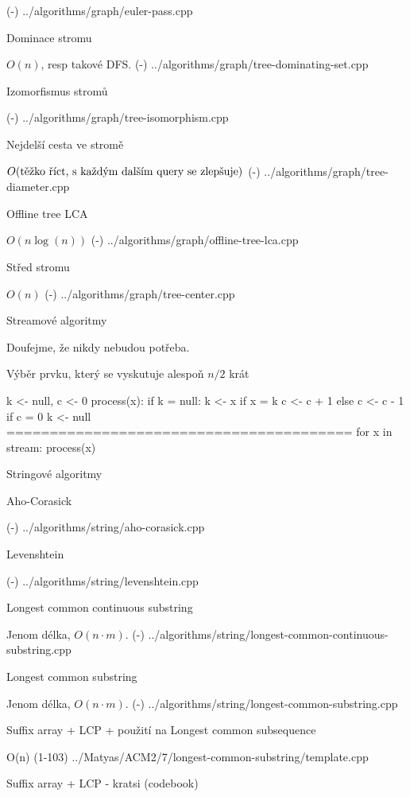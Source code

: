 \verbinput (-) ../algorithms/graph/euler-pass.cpp

\secc Dominace stromu 

$O(n)$, resp takové DFS.
\verbinput (-) ../algorithms/graph/tree-dominating-set.cpp

\secc Izomorfismus stromů

\verbinput (-) ../algorithms/graph/tree-isomorphism.cpp

\secc Nejdelší cesta ve stromě 

$O(\hbox{těžko říct, s každým dalším query se zlepšuje})$
\verbinput (-) ../algorithms/graph/tree-diameter.cpp

\secc Offline tree LCA 

$O(n\log(n))$
\verbinput (-) ../algorithms/graph/offline-tree-lca.cpp

\secc Střed stromu 

$O(n)$
\verbinput (-) ../algorithms/graph/tree-center.cpp

\sec Streamové algoritmy

Doufejme, že nikdy nebudou potřeba.

\secc Výběr prvku, který se vyskutuje alespoň $n/2$ krát

\begtt
k <- null, c <- 0
process(x):
  if k = null:
    k <- x
  if x = k
    c <- c + 1
  else
    c <- c - 1
    if c = 0
      k <- null
========================================
for x in stream:
  process(x)
\endtt

\sec Stringové algoritmy

\secc Aho-Corasick

\verbinput (-) ../algorithms/string/aho-corasick.cpp

\secc Levenshtein 

\verbinput (-) ../algorithms/string/levenshtein.cpp

\secc Longest common continuous substring 

Jenom délka, $O(n \cdot m)$.
\verbinput (-) ../algorithms/string/longest-common-continuous-substring.cpp

\secc Longest common substring 

Jenom délka, $O(n \cdot m)$.
\verbinput (-) ../algorithms/string/longest-common-substring.cpp

\secc Suffix array + LCP + použití na Longest common subsequence 

O(n)
\verbinput (1-103) ../Matyas/ACM2/7/longest-common-substring/template.cpp

\secc Suffix array + LCP - kratsi (codebook)

